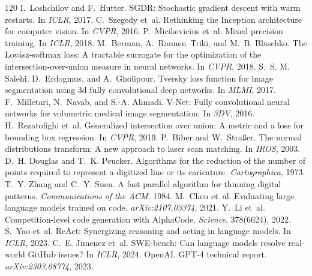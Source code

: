 \documentclass[10pt,twocolumn]{article}
\begin{document}
\begin{thebibliography}{120}
 I.~Loshchilov and F.~Hutter. SGDR: Stochastic gradient descent with warm restarts. In \emph{ICLR}, 2017.
 C.~Szegedy et~al. Rethinking the Inception architecture for computer vision. In \emph{CVPR}, 2016.
 P.~Micikevicius et~al. Mixed precision training. In \emph{ICLR}, 2018.
 M.~Berman, A.~Rannen~Triki, and M.~B. Blaschko. The Lov\'asz-softmax loss: A tractable surrogate for the optimization of the intersection-over-union measure in neural networks. In \emph{CVPR}, 2018.
 S.~S. M. Salehi, D.~Erdogmus, and A.~Gholipour. Tversky loss function for image segmentation using 3d fully convolutional deep networks. In \emph{MLMI}, 2017.
 F.~Milletari, N.~Navab, and S.-A. Ahmadi. V-Net: Fully convolutional neural networks for volumetric medical image segmentation. In \emph{3DV}, 2016.
 H.~Rezatofighi et~al. Generalized intersection over union: A metric and a loss for bounding box regression. In \emph{CVPR}, 2019.
 P.~Biber and W.~Stra{\ss}er. The normal distributions transform: A new approach to laser scan matching. In \emph{IROS}, 2003.
 D.~H. Douglas and T.~K. Peucker. Algorithms for the reduction of the number of points required to represent a digitized line or its caricature. \emph{Cartographica}, 1973.
 T.~Y. Zhang and C.~Y. Suen. A fast parallel algorithm for thinning digital patterns. \emph{Communications of the ACM}, 1984.
 M.~Chen et~al. Evaluating large language models trained on code. \emph{arXiv:2107.03374}, 2021.
 Y.~Li et~al. Competition-level code generation with AlphaCode. \emph{Science}, 378(6624), 2022.
 S.~Yao et~al. ReAct: Synergizing reasoning and acting in language models. In \emph{ICLR}, 2023.
 C.~E. Jimenez et~al. SWE-bench: Can language models resolve real-world GitHub issues? In \emph{ICLR}, 2024.
 OpenAI. GPT-4 technical report. \emph{arXiv:2303.08774}, 2023.

\end{thebibliography}
\end{document}
